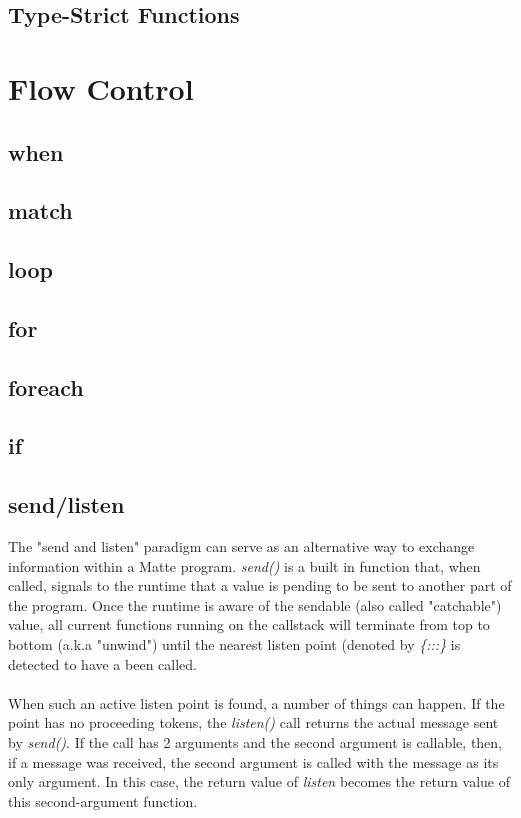\documentclass[12pt,letterpaper]{report}
\begin{document}
\section{Type-Strict Functions}\label{Type-Strict Functions}
\chapter{Flow Control}\label{Flow Control}
\section{when}\label{when}
\section{match}\label{match}
\section{loop}\label{loop}
\section{for}\label{for}
\section{foreach}\label{foreach}
\section{if}\label{if}
\section{send/listen}\label{send/listen}

The "send and listen" paradigm can serve as an alternative way to exchange information within 
a Matte program. \textit{send()} is a built in function that, when called, signals to the runtime
that a value is pending to be sent to another part of the program. Once the runtime is aware of 
the sendable (also called "catchable") value, all current functions running on the callstack 
will terminate from top to bottom (a.k.a "unwind") until the nearest listen point
(denoted by \textit{\{:::\}} is detected to have a been called.
\\\\
When such an active listen point is found, a number of things can happen.
If the point has no proceeding tokens, the \textit{listen()} call returns 
the actual message sent by \textit{send()}. If the call has 2 arguments and the second 
argument is callable, then, if a message was received, the second argument is called 
with the message as its only argument. In this case, the return value of \textit{listen} 
becomes the return value of this second-argument function.
\end{document}
